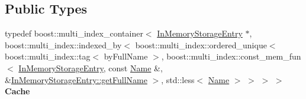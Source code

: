\subsection*{Public Types}
\begin{DoxyCompactItemize}
\item 
typedef boost\+::multi\+\_\+index\+\_\+container$<$ \hyperlink{classndn_1_1util_1_1InMemoryStorageEntry}{In\+Memory\+Storage\+Entry} $\ast$, boost\+::multi\+\_\+index\+::indexed\+\_\+by$<$ boost\+::multi\+\_\+index\+::ordered\+\_\+unique$<$ boost\+::multi\+\_\+index\+::tag$<$ by\+Full\+Name $>$, boost\+::multi\+\_\+index\+::const\+\_\+mem\+\_\+fun$<$ \hyperlink{classndn_1_1util_1_1InMemoryStorageEntry}{In\+Memory\+Storage\+Entry}, const \hyperlink{classndn_1_1Name}{Name} \&, \&\hyperlink{classndn_1_1util_1_1InMemoryStorageEntry_a984325afc10d6b83b6dfe08e1bfb311d}{In\+Memory\+Storage\+Entry\+::get\+Full\+Name} $>$, std\+::less$<$ \hyperlink{classndn_1_1Name}{Name} $>$ $>$ $>$ $>$ {\bfseries Cache}\hypertarget{classndn_1_1util_1_1InMemoryStorage_ac381415d7cb11c2895c393450387b5ff}{}\label{classndn_1_1util_1_1InMemoryStorage_ac381415d7cb11c2895c393450387b5ff}

\end{DoxyCompactItemize}

